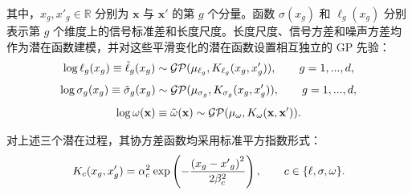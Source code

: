\documentclass[]{interact}
\theoremstyle{plain}%
\theoremstyle{definition}
\theoremstyle{remark}
\begin{document}
其中，$x_{g}, x'_{g} \in \mathbb{R}$ 分别为 $\mathbf{x}$ 与 $\mathbf{x}'$ 的第 $g$ 个分量。函数 $\sigma(x_{g})$ 和 $\ell_{g}(x_{g})$ 分别表示第 $g$ 个维度上的信号标准差和长度尺度。长度尺度、信号方差和噪声方差均作为潜在函数建模，并对这些平滑变化的潜在函数设置相互独立的 GP 先验：
\begin{equation}
	\log {\ell _g}({x_g}) \equiv {\tilde \ell _g}({x_g})\sim{\cal G}{\cal P}({\mu _{{\ell _g}}},{K_{{\ell _g}}}({x_g},{x'_g})),\qquad g = 1,...,d,
\end{equation}
\begin{equation}
	\log {\sigma _g}({x_g}) \equiv {\tilde \sigma _g}({x_g})\sim{\cal G}{\cal P}({\mu _{{\sigma _g}}},{K_{{\sigma _g}}}({x_g},{x'_g})),\qquad g = 1,...,d,
\end{equation}
\begin{equation}
	\log \omega ({\bf{x}}) \equiv \tilde \omega ({\bf{x}})\sim{\cal G}{\cal P}({\mu _\omega },{K_\omega }({\bf{x}},{\bf{x'}})).
\end{equation}

对上述三个潜在过程，其协方差函数均采用标准平方指数形式：
\begin{equation}
	{K_c}({x_g},{x'_g}) = \alpha _c^2{\mkern 1mu} \exp \left( { - \frac{{{{({x_g} - {{x'}_g})}^2}}}{{2\beta _c^2}}} \right),\qquad c \in \{ \ell ,\sigma ,\omega \} .
\end{equation}
\end{document}
